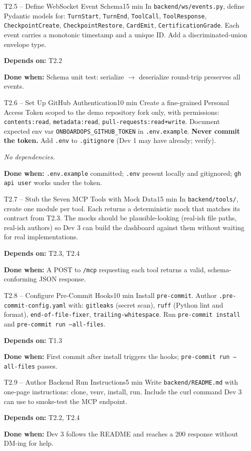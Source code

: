 \documentclass[11pt,letterpaper]{article}
\newcommand{\acceptance}[1]{\par\smallskip\textcolor{ibmgreen}{\textbf{Done when:}} #1}
\newcommand{\depends}[1]{\par\smallskip\textcolor{ibmorange}{\textbf{Depends on:}} #1}
\newcommand{\nodep}{\par\smallskip\textcolor{ibmgray}{\textit{No dependencies.}}}
\begin{document}
\begin{task}{T2.5 -- Define WebSocket Event Schema}{15 min}
In \texttt{backend/ws/events.py}, define Pydantic models for: \texttt{TurnStart}, \texttt{TurnEnd}, \texttt{ToolCall}, \texttt{ToolResponse}, \texttt{CheckpointCreate}, \texttt{CheckpointRestore}, \texttt{CardEmit}, \texttt{CertificationGrade}. Each event carries a monotonic timestamp and a unique ID. Add a discriminated-union envelope type.
\depends{T2.2}
\acceptance{Schema unit test: serialize $\rightarrow$ deserialize round-trip preserves all events.}
\end{task}

\begin{task}{T2.6 -- Set Up GitHub Authentication}{10 min}
Create a fine-grained Personal Access Token scoped to the demo repository fork only, with permissions: \texttt{contents:read}, \texttt{metadata:read}, \texttt{pull-requests:read+write}. Document expected env var \texttt{ONBOARDOPS\_GITHUB\_TOKEN} in \texttt{.env.example}. \textbf{Never commit the token.} Add \texttt{.env} to \texttt{.gitignore} (Dev 1 may have already; verify).
\nodep
\acceptance{\texttt{.env.example} committed; \texttt{.env} present locally and gitignored; \texttt{gh api user} works under the token.}
\end{task}

\begin{task}{T2.7 -- Stub the Seven MCP Tools with Mock Data}{15 min}
In \texttt{backend/tools/}, create one module per tool. Each returns a deterministic mock that matches its contract from T2.3. The mocks should be plausible-looking (real-ish file paths, real-ish authors) so Dev 3 can build the dashboard against them without waiting for real implementations.
\depends{T2.3, T2.4}
\acceptance{A POST to \texttt{/mcp} requesting each tool returns a valid, schema-conforming JSON response.}
\end{task}

\begin{task}{T2.8 -- Configure Pre-Commit Hooks}{10 min}
Install \texttt{pre-commit}. Author \texttt{.pre-commit-config.yaml} with: \texttt{gitleaks} (secret scan), \texttt{ruff} (Python lint and format), \texttt{end-of-file-fixer}, \texttt{trailing-whitespace}. Run \texttt{pre-commit install} and \texttt{pre-commit run --all-files}.
\depends{T1.3}
\acceptance{First commit after install triggers the hooks; \texttt{pre-commit run --all-files} passes.}
\end{task}

\begin{task}{T2.9 -- Author Backend Run Instructions}{5 min}
Write \texttt{backend/README.md} with one-page instructions: clone, venv, install, run. Include the curl command Dev 3 can use to smoke-test the MCP endpoint.
\depends{T2.2, T2.4}
\acceptance{Dev 3 follows the README and reaches a 200 response without DM-ing for help.}
\end{task}
\end{document}
